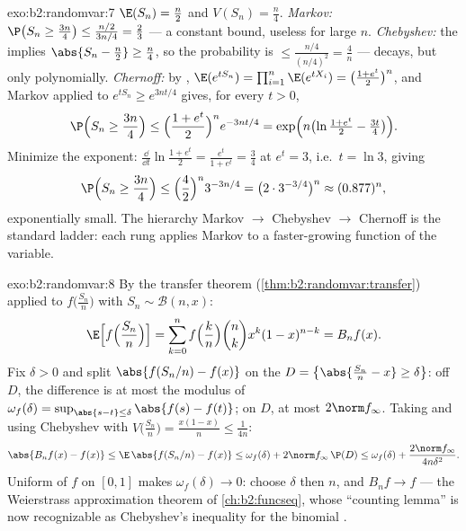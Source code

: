 \begin{solution}{exo:b2:randomvar:7}
$\E(S_n) = \frac n2$ and $V(S_n) = \frac n4$.
\emph{Markov:} $\P\bigl(S_n \geq \frac{3n}4\bigr) \leq
\frac{n/2}{3n/4} = \frac23$ --- a constant bound, useless for
large $n$.
\emph{Chebyshev:} the  implies $\abs{S_n - \frac n2} \geq
\frac n4$, so the probability is $\leq \frac{n/4}{(n/4)^2} =
\frac4n$ --- decays, but only polynomially.
\emph{Chernoff:} by , $\E(e^{tS_n}) =
\prod_{i=1}^n\E(e^{tX_i}) = \bigl(\frac{1 + e^t}{2}\bigr)^n$, and
Markov applied to $e^{tS_n} \geq e^{3nt/4}$ gives, for every $t >
0$,
\[
\P\Bigl(S_n \geq \frac{3n}4\Bigr)
\leq \Bigl(\frac{1 + e^t}{2}\Bigr)^n e^{-3nt/4}
= \exp\Bigl(n\bigl(\ln\tfrac{1 + e^t}{2} - \tfrac{3t}4\bigr)\Bigr).
\]
Minimize the exponent: $\frac{\dd}{\dd t}\ln\frac{1+e^t}{2} =
\frac{e^t}{1 + e^t} = \frac34$ at $e^t = 3$, i.e.\ $t = \ln 3$,
giving
\[
\P\Bigl(S_n \geq \frac{3n}4\Bigr)
\leq \Bigl(\frac{4}{2}\Bigr)^n 3^{-3n/4}
= \bigl(2 \cdot 3^{-3/4}\bigr)^n \approx (0.877)^n ,
\]
exponentially small. The hierarchy Markov $\to$ Chebyshev $\to$
Chernoff is the standard ladder: each rung applies Markov to a
faster-growing function of the variable.
\end{solution}

\begin{solution}{exo:b2:randomvar:8}
By the transfer theorem (\cref{thm:b2:randomvar:transfer})
applied to $f\bigl(\frac{S_n}{n}\bigr)$ with $S_n \sim
\mathcal{B}(n, x)$:
\[
\E\Bigl[f\Bigl(\frac{S_n}{n}\Bigr)\Bigr]
= \sum_{k=0}^n f\Bigl(\frac kn\Bigr)\binom nk x^k(1-x)^{n-k}
= B_nf(x) .
\]
Fix $\delta > 0$ and split $\abs{f(S_n/n) - f(x)}$ on the  $D
= \bigl\{\abs{\frac{S_n}{n} - x} \geq \delta\bigr\}$:
off $D$, the difference is at most the modulus of 
$\omega_f(\delta) = \sup_{\abs{s - t}\leq\delta}\abs{f(s) -
f(t)}$; on $D$, at most $2\norm f_\infty$. Taking  and
using Chebyshev with $V\bigl(\frac{S_n}{n}\bigr) =
\frac{x(1-x)}{n} \leq \frac{1}{4n}$:
\[
\abs{B_nf(x) - f(x)}
\leq \E\,\abs{f(S_n/n) - f(x)}
\leq \omega_f(\delta)
+ 2\norm f_\infty\,\P(D)
\leq \omega_f(\delta) + \frac{2\norm f_\infty}{4n\delta^2} .
\]
Uniform  of $f$ on $[0, 1]$ makes $\omega_f(\delta) \to
0$: choose $\delta$ then $n$, and $B_nf \to f$  --- the
Weierstrass approximation theorem of \cref{ch:b2:funcseq}, whose
``counting lemma'' is now recognizable as Chebyshev's inequality
for the binomial .
\end{solution}

